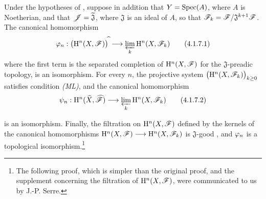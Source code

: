 \begin{corollary}[4.1.7]
\label{III.4.1.7}
Under the hypotheses of , suppose in addition that
$Y=\operatorname{Spec}(A)$, where $A$ is Noetherian, and that
$\mathscr{J}=\widetilde{\mathfrak{J}}$, where $\mathfrak{J}$ is an ideal
of $A$, so that $\mathscr{F}_k=\mathscr{F}/\mathfrak{J}^{k+1}\mathscr{F}$.
The canonical homomorphism
\[
  \varphi_n:
  \bigl(\mathrm{H}^n(X,\mathscr{F})\bigr)^{\widehat{\,}}
  \longrightarrow
  \varprojlim_k\mathrm{H}^n(X,\mathscr{F}_k)
  \tag{4.1.7.1}
  \label{III.4.1.7.1}
\]
where the first term is the separated completion of
$\mathrm{H}^n(X,\mathscr{F})$ for the $\mathfrak{J}$-preadic topology, is an
isomorphism.
For every $n$, the projective system $\bigl(\mathrm{H}^n(X,\mathscr{F}_k)\bigr)_{k\geq0}$
satisfies condition \emph{(ML)}, and the canonical homomorphism
\[
  \psi_n:
  \mathrm{H}^n(\widehat{X},\widehat{\mathscr{F}})
  \longrightarrow
  \varprojlim_k\mathrm{H}^n(X,\mathscr{F}_k)
  \tag{4.1.7.2}
  \label{III.4.1.7.2}
\]


is an isomorphism.
Finally, the filtration on $\mathrm{H}^n(X,\mathscr{F})$ defined by the kernels
of the canonical homomorphisms $\mathrm{H}^n(X,\mathscr{F})\longrightarrow\mathrm{H}^n(X,\mathscr{F}_k)$
is $\mathfrak{J}$-good , and $\varphi_n$ is a
topological isomorphism.\footnote{The following proof, which is
simpler than the original proof, and the supplement concerning the
filtration of $\mathrm{H}^n(X,\mathscr{F})$, were communicated to us by
J.-P. Serre.}
\end{corollary}

